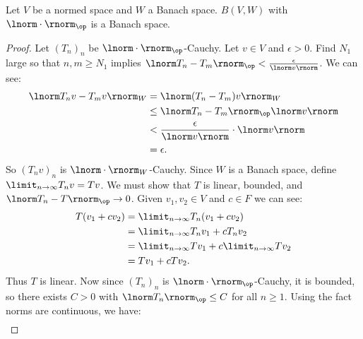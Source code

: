     \begin{proposition}
        Let $V$ be a normed space and $W$ a Banach space. $B(V,W)$ with $\lnorm \cdot \rnorm_{\op}$ is a Banach space.
    \end{proposition}
        \begin{proof}
            Let $(T_n)_n$ be $\lnorm \cdot \rnorm_{\op}$-Cauchy. Let $v \in V$ and $\epsilon > 0$. Find $N_1$ large so that $n,m \geq N_1$ implies $\lnorm T_n - T_m \rnorm_{\op} < \frac{\epsilon}{\lnorm v \rnorm}$. We can see:
                \begin{equation*}
                \begin{split}
                    \lnorm T_nv - T_mv \rnorm_W
                    & = \lnorm (T_n - T_m)v \rnorm_W \\
                    & \leq \lnorm T_n - T_m \rnorm_{\op}\lnorm v \rnorm \\
                    & < \frac{\epsilon}{\lnorm v \rnorm} \cdot \lnorm v \rnorm \\
                    & = \epsilon.
                \end{split}
                \end{equation*}
            So $(T_nv)_n$ is $\lnorm \cdot \rnorm_W$-Cauchy. Since $W$ is a Banach space, define $\limit_{n \rightarrow \infty}T_n v = Tv$. We must show that $T$ is linear, bounded, and $\lnorm T_n - T \rnorm_{\op} \rightarrow 0$. Given $v_1,v_2 \in V$ and $c \in F$ we can see:
                \begin{equation*}
                \begin{split}
                    T(v_1 + cv_2) 
                    & = \limit_{n \rightarrow \infty} T_n(v_1 + c v_2) \\
                    & = \limit_{n \rightarrow \infty}T_nv_1 + c T_n v_2 \\
                    & = \limit_{n \rightarrow \infty}Tv_1 + c\limit_{n \rightarrow \infty}T v_2 \\
                    & = Tv_1 + cT v_2.
                \end{split}
                \end{equation*}
            Thus $T$ is linear. Now since $(T_n)_n$ is $\lnorm \cdot \rnorm_{\op}$-Cauchy, it is bounded, so there exists $C > 0$ with $\lnorm T_n \rnorm_{\op} \leq C$ for all $n \geq 1$. Using the fact norms are continuous, we have:
                \begin{equation*}
                \begin{split}

\end{split}
\end{equation*}
\end{proof}
